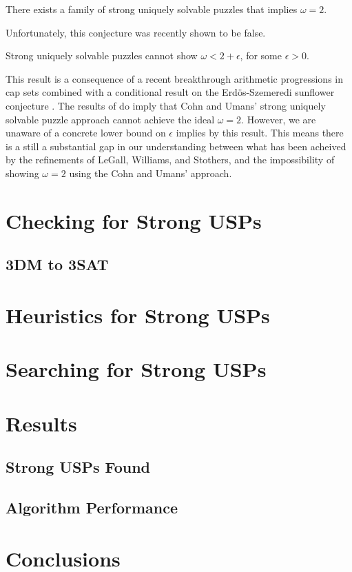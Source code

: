 \documentclass[11pt]{article}
\begin{document}
\begin{conjecture}
  There exists a family of strong uniquely solvable puzzles that
  implies $\omega = 2$.
\end{conjecture}

Unfortunately, this conjecture was recently shown to be false.

\begin{lemma}
  Strong uniquely solvable puzzles cannot show $\omega < 2 +
  \epsilon$, for some $\epsilon > 0$.
\end{lemma}

This result is a consequence of a recent breakthrough arithmetic
progressions in cap sets \cite{e16,clp16} combined with a conditional
result on the Erd\"{o}s-Szemeredi sunflower conjecture \cite{asu13}.
The results of \cite{bccgu16} do imply that Cohn and Umans' strong
uniquely solvable puzzle approach cannot achieve the ideal $\omega =
2$.  However, we are unaware of a concrete lower bound on $\epsilon$
implies by this result.  This means there is a still a substantial gap
in our understanding between what has been acheived by the refinements
of LeGall, Williams, and Stothers, and the impossibility of showing
$\omega = 2$ using the Cohn and Umans' approach.



\section{Checking for Strong USPs}
\label{sec:check}

\subsection{3DM to 3SAT}
\label{subsec:3sat}

\section{Heuristics for Strong USPs}
\label{sec:heuristic}

\section{Searching for Strong USPs}
\label{sec:search}

\section{Results}
\label{sec:results}

\subsection{Strong USPs Found}
\label{subsec:usps_found}

\subsection{Algorithm Performance}
\label{subsec:performance}

\section{Conclusions}
\label{sec:conclusion}



 

\appendix
\end{document}

